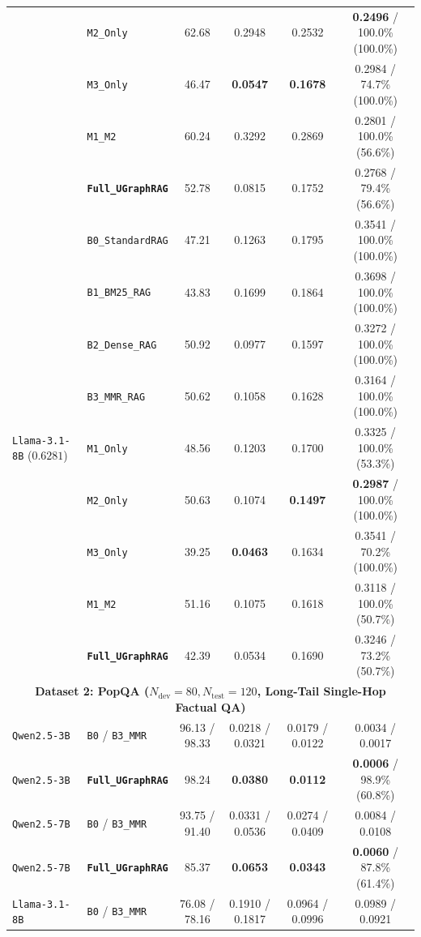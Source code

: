 \documentclass[11pt]{article}
\begin{document}
\begin{table}[t]
{{\begin{tabular}{llcccc}
& \texttt{M2\_Only} & 62.68 & 0.2948 & 0.2532 & \textbf{0.2496} / 100.0\% (100.0\%) \\
& \texttt{M3\_Only} & 46.47 & \textbf{0.0547} & \textbf{0.1678} & 0.2984 / 74.7\% (100.0\%) \\
& \texttt{M1\_M2} & 60.24 & 0.3292 & 0.2869 & 0.2801 / 100.0\% (56.6\%) \\
& \textbf{\texttt{Full\_UGraphRAG}} & 52.78 & 0.0815 & 0.1752 & 0.2768 / 79.4\% (56.6\%) \\
\midrule
\multirow{9}{*}{\texttt{Llama-3.1-8B} ($0.6281$)}
& \texttt{B0\_StandardRAG} & 47.21 & 0.1263 & 0.1795 & 0.3541 / 100.0\% (100.0\%) \\
& \texttt{B1\_BM25\_RAG} & 43.83 & 0.1699 & 0.1864 & 0.3698 / 100.0\% (100.0\%) \\
& \texttt{B2\_Dense\_RAG} & 50.92 & 0.0977 & 0.1597 & 0.3272 / 100.0\% (100.0\%) \\
& \texttt{B3\_MMR\_RAG} & 50.62 & 0.1058 & 0.1628 & 0.3164 / 100.0\% (100.0\%) \\
& \texttt{M1\_Only} & 48.56 & 0.1203 & 0.1700 & 0.3325 / 100.0\% (53.3\%) \\
& \texttt{M2\_Only} & 50.63 & 0.1074 & \textbf{0.1497} & \textbf{0.2987} / 100.0\% (100.0\%) \\
& \texttt{M3\_Only} & 39.25 & \textbf{0.0463} & 0.1634 & 0.3541 / 70.2\% (100.0\%) \\
& \texttt{M1\_M2} & 51.16 & 0.1075 & 0.1618 & 0.3118 / 100.0\% (50.7\%) \\
& \textbf{\texttt{Full\_UGraphRAG}} & 42.39 & 0.0534 & 0.1690 & 0.3246 / 73.2\% (50.7\%) \\
\midrule
\multicolumn{6}{c}{\textbf{Dataset 2: PopQA ($N_{\text{dev}}=80, N_{\text{test}}=120$, Long-Tail Single-Hop Factual QA)}} \\
\midrule
\texttt{Qwen2.5-3B} & \texttt{B0} / \texttt{B3\_MMR} & 96.13 / 98.33 & 0.0218 / 0.0321 & 0.0179 / 0.0122 & 0.0034 / 0.0017 \\
\texttt{Qwen2.5-3B} & \textbf{\texttt{Full\_UGraphRAG}} & 98.24 & \textbf{0.0380} & \textbf{0.0112} & \textbf{0.0006} / 98.9\% (60.8\%) \\
\texttt{Qwen2.5-7B} & \texttt{B0} / \texttt{B3\_MMR} & 93.75 / 91.40 & 0.0331 / 0.0536 & 0.0274 / 0.0409 & 0.0084 / 0.0108 \\
\texttt{Qwen2.5-7B} & \textbf{\texttt{Full\_UGraphRAG}} & 85.37 & \textbf{0.0653} & \textbf{0.0343} & \textbf{0.0060} / 87.8\% (61.4\%) \\
\texttt{Llama-3.1-8B} & \texttt{B0} / \texttt{B3\_MMR} & 76.08 / 78.16 & 0.1910 / 0.1817 & 0.0964 / 0.0996 & 0.0989 / 0.0921 \\

\end{tabular}}}
\end{table}
\end{document}

